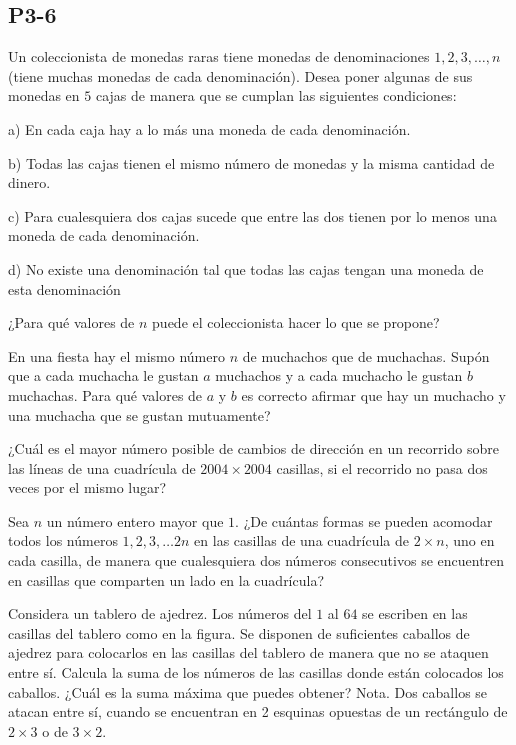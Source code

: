 \documentclass[11pt]{scrartcl}
\begin{document}
\subsection{P3-6} 
\begin{problem}
    [2001/6] 
    Un coleccionista de monedas raras tiene monedas de denominaciones $1,2,3,\dots,n$ (tiene muchas monedas de cada denominación). Desea poner algunas de sus monedas en $5$ cajas de manera que se cumplan las siguientes condiciones:

a) En cada caja hay a lo más una moneda de cada denominación.

b) Todas las cajas tienen el mismo número de monedas y la misma cantidad de dinero.

c) Para cualesquiera dos cajas sucede que entre las dos tienen por lo menos una moneda de cada denominación.

d) No existe una denominación tal que todas las cajas tengan una moneda de esta denominación

¿Para qué valores de $n$ puede el coleccionista hacer lo que se propone?
\end{problem}
\begin{problem}
    [2003/3]
    En una fiesta hay el mismo número $n$ de muchachos que de muchachas. Supón que a cada muchacha le gustan $a$ muchachos y a cada muchacho le gustan $b$ muchachas. Para qué valores de $a$ y $b$ es correcto afirmar que hay un muchacho y una muchacha que se gustan mutuamente?
    
\end{problem}
\begin{problem}
    [2004/6] 
    ¿Cuál es el mayor número posible de cambios de dirección en un recorrido sobre las líneas de una cuadrícula de $2004\times 2004$ casillas, si el recorrido no pasa dos veces por el mismo lugar?
\end{problem}
\begin{problem}
    [2006/3]
    Sea $n$ un número entero mayor que $1$. ¿De cuántas formas se pueden acomodar todos los números $1,2,3,\dots 2n$ en las casillas de una cuadrícula de $2\times n$, uno en cada casilla, de manera que cualesquiera dos números consecutivos se encuentren en casillas que comparten un lado en la cuadrícula?
\end{problem}
\begin{problem}
    [2008/3]
    Considera un tablero de ajedrez. Los números del $1$ al $64$ se escriben en las casillas del
tablero como en la figura. Se disponen de suficientes caballos de ajedrez para colocarlos en las casillas del tablero de
manera que no se ataquen entre sí. Calcula la suma de los números de las casillas donde
están colocados los caballos. ¿Cuál es la suma máxima que puedes obtener? Nota. Dos
caballos se atacan entre sí, cuando se encuentran en 2 esquinas opuestas de un rectángulo
de $2\times 3$ o de $3 \times 2$.
\end{problem}
\end{document}
